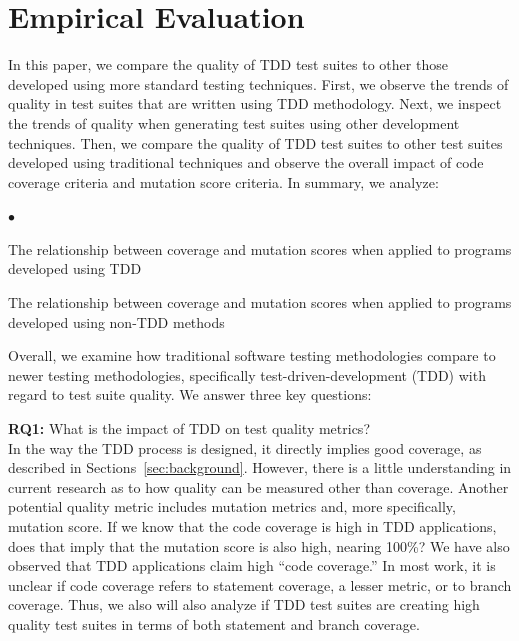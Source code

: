 \documentclass[conference]{IEEEtran}
\newcommand{\squishlist}{
 \begin{list}{$\bullet$}
  { \setlength{\itemsep}{0pt}
     \setlength{\parsep}{3pt}
     \setlength{\topsep}{3pt}
     \setlength{\partopsep}{0pt}
     \setlength{\leftmargin}{1.5em}
     \setlength{\labelwidth}{1em}
     \setlength{\labelsep}{0.5em} } }
\newcommand{\squishend}{
  \end{list}  }
\begin{document}
\section{Empirical Evaluation} %
In this paper, we compare the quality of TDD test suites to other those developed using more standard testing techniques. First, we observe the trends of quality in test suites that are written using TDD methodology. Next, we inspect the trends of quality when generating test suites using other development techniques. Then, we compare the quality of TDD test suites to other test suites developed using traditional techniques and observe the overall impact of code coverage criteria and mutation score criteria.  In summary, we analyze:
\squishlist
\item The relationship between coverage and mutation scores when applied to programs developed using TDD
\item The relationship between coverage and mutation scores when applied to programs developed using non-TDD methods
\squishend
Overall, we examine how traditional software testing  methodologies compare to newer testing methodologies, specifically test-driven-development (TDD) with regard to test suite quality.  We answer three key questions:

\textbf{RQ1:} What is the impact of TDD on test quality metrics?\\
In the way the TDD process is designed, it directly implies good coverage, as described in Sections~\ref{sec:background}. However, there is a little understanding in current research as to how  quality can be measured other than coverage. Another potential quality metric includes mutation metrics and, more specifically, mutation score. If we know that the code coverage is high in TDD applications, does that imply that the mutation score is also high, nearing 100\%? 
We have also observed that TDD applications claim high ``code coverage.'' In most work, it is unclear if code coverage refers to statement coverage, a lesser metric, or to branch coverage.  Thus, we also will also analyze if TDD test suites are creating high quality test suites in terms of both statement and branch coverage.
\end{document}
